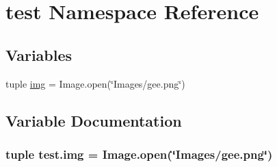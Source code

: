 \hypertarget{namespacetest}{}\section{test Namespace Reference}
\label{namespacetest}
\subsection*{Variables}
\begin{DoxyCompactItemize}
\item 
tuple \hyperlink{namespacetest_abdcfebe6931955c52d9d6db72d7d64c2}{img} = Image.\+open(\char`\"{}Images/gee.\+png\char`\"{})
\end{DoxyCompactItemize}


\subsection{Variable Documentation}
\hypertarget{namespacetest_abdcfebe6931955c52d9d6db72d7d64c2}{}
\subsubsection[{img}]{\setlength{\rightskip}{0pt plus 5cm}tuple test.\+img = Image.\+open(\char`\"{}Images/gee.\+png\char`\"{})}\label{namespacetest_abdcfebe6931955c52d9d6db72d7d64c2}
